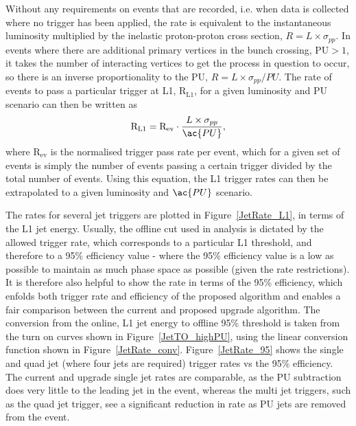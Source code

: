 Without any requirements on events that are recorded, i.e. when data is collected where no trigger has been applied, the rate is 
equivalent to the instantaneous luminosity multiplied by the inelastic proton-proton cross section, $R = L\times \sigma_{pp}$. 
In events where there are additional primary vertices in the bunch crossing, \ac{PU}$>1$, it takes the number of interacting vertices to get the process in question to occur, so there is an inverse proportionality to the \ac{PU}, $R = L\times \sigma_{pp}/PU$.
The rate of events to pass a particular trigger at \ac{L1}, $\text{R}_{\text{L1}}$, for a given luminosity and \ac{PU} scenario can then be written as
%
\begin{equation}
\text{R}_{\rm L1} = \text{R}_{\text{ev}} \cdot \frac{L\times \sigma_{pp}}{\ac{PU}},
\end{equation}
%
where $\text{R}_{\text{ev}}$ is the normalised trigger pass rate per event, which for a given set of events is simply the number of events passing a certain trigger divided by the total number of events.
%
Using this equation, the \ac{L1} trigger rates can then be extrapolated to a given luminosity and $\ac{PU}$ scenario.


The rates for several jet triggers are plotted in Figure~\ref{JetRate_L1}, in terms of the \ac{L1} jet energy.
%
Usually, the offline cut used in analysis is dictated by the allowed trigger rate, which corresponds to a particular \ac{L1} threshold, and therefore to a 95\% efficiency value - where the 95\% efficiency value is a low as possible to maintain as much phase space as possible (given the rate restrictions).
It is therefore also helpful to show the rate in terms of the 95\% efficiency, which enfolds both trigger rate and efficiency of the proposed algorithm and enables a fair comparison between the current and proposed upgrade algorithm.
The conversion from the online, \ac{L1} jet energy to offline 95\% threshold is taken from the turn on curves shown in Figure~\ref{JetTO_highPU}, using the linear conversion function shown in Figure~\ref{JetRate_conv}.
Figure~\ref{JetRate_95} shows the single and quad jet (where four jets are required) trigger rates vs the 95\% efficiency. 
The current and upgrade single jet rates are comparable, as the PU subtraction does very little to the leading jet in the event, whereas the multi jet triggers, such as the quad jet trigger, see a significant reduction in rate as PU jets are removed from the event.     

